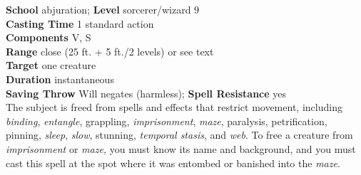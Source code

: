 \textbf{School} abjuration; \textbf{Level} sorcerer/wizard 9\\
\textbf{Casting Time} 1 standard action\\
\textbf{Components} V, S\\
\textbf{Range} close (25 ft. + 5 ft./2 levels) or see text\\
\textbf{Target} one creature\\
\textbf{Duration} instantaneous\\
\textbf{Saving Throw }Will negates (harmless); \textbf{Spell Resistance} yes\\
The subject is freed from spells and effects that restrict movement, including \textit{binding}, \textit{entangle}, grappling, \textit{imprisonment}, \textit{maze}, paralysis, petrification, pinning, \textit{sleep}, \textit{slow}, stunning, \textit{temporal stasis}, and \textit{web}. To free a creature from \textit{imprisonment }or \textit{maze, }you must know its name and background, and you must cast this spell at the spot where it was entombed or banished into the \textit{maze}.\\
